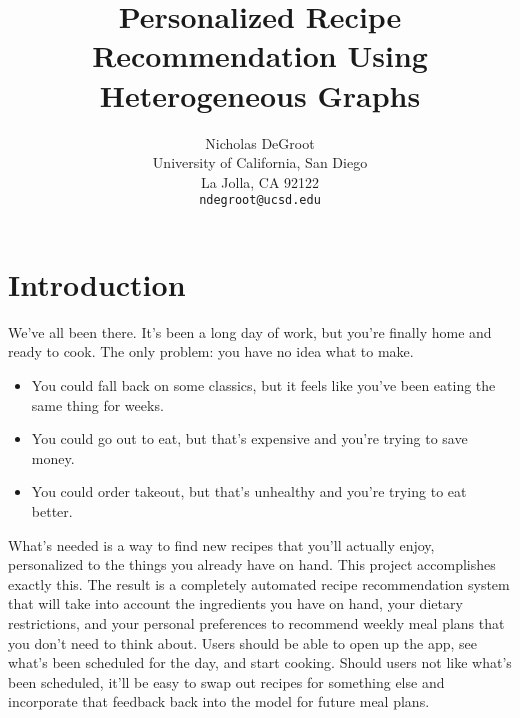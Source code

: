 \documentclass{article}
\title{Personalized Recipe Recommendation Using Heterogeneous Graphs}
\author{%
  Nicholas DeGroot \\
  University of California, San Diego \\
  La Jolla, CA 92122 \\
  \texttt{ndegroot@ucsd.edu}
}
\begin{document}
\maketitle


\begin{abstract}
  \answerTODO
\end{abstract}


\section{Introduction}
% 
% 
% 
% 


We've all been there. It's been a long day of work, but you're finally home and ready to cook. The only problem: you have no idea what to make.

\begin{itemize}
  \item You could fall back on some classics, but it feels like you've been eating the same thing for weeks.
  \item You could go out to eat, but that's expensive and you're trying to save money.
  \item You could order takeout, but that's unhealthy and you're trying to eat better.
\end{itemize}

What's needed is a way to find new recipes that you'll actually enjoy, personalized to the things you already have on hand. This project accomplishes exactly this. The result is a completely automated recipe recommendation system that will take into account the ingredients you have on hand, your dietary restrictions, and your personal preferences to recommend weekly meal plans that you don't need to think about. Users should be able to open up the app, see what's been scheduled for the day, and start cooking. Should users not like what's been scheduled, it'll be easy to swap out recipes for something else and incorporate that feedback back into the model for future meal plans.
\end{document}
